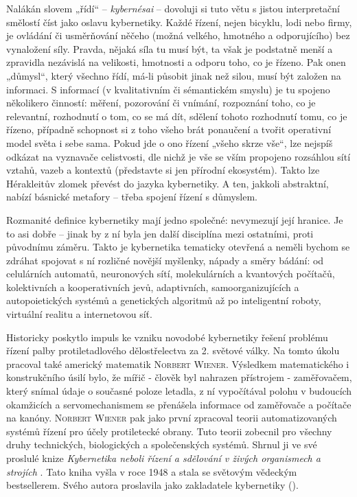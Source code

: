     Nalákán slovem „řídí“ – \emph{kybernésai} – dovoluji si tuto větu s jistou interpretační
    smělostí číst jako oslavu kybernetiky. Každé řízení, nejen bicyklu, lodi nebo firmy, je ovládání
    či usměrňování něčeho (možná velkého, hmotného a odporujícího) bez vynaložení síly. Pravda,
    nějaká síla tu musí být, ta však je podstatně menší a zpravidla nezávislá na velikosti,
    hmotnosti a odporu toho, co je řízeno. Pak onen „důmysl“, který všechno řídí, má-li působit
    jinak než silou, musí být založen na informaci. S informací (v kvalitativním či sémantickém
    smyslu) je tu spojeno několikero činností: měření, pozorování či vnímání, rozpoznání toho, co je
    relevantní, rozhodnutí o tom, co se má dít, sdělení tohoto rozhodnutí tomu, co je řízeno,
    případně schopnost si z toho všeho brát ponaučení a tvořit operativní model světa i sebe sama.
    Pokud jde o ono řízení „všeho skrze vše“, lze nejspíš odkázat na vyznavače celistvosti, dle
    nichž je vše se vším propojeno rozsáhlou sítí vztahů, vazeb a kontextů (představte si jen
    přírodní ekosystém). Takto lze Hérakleitův zlomek převést do jazyka kybernetiky. A ten, jakkoli
    abstraktní, nabízí básnické metafory – třeba spojení řízení s důmyslem.


    Rozmanité definice kybernetiky mají jedno společné: nevymezují její hranice. Je to asi dobře –
    jinak by z ní byla jen další disciplína mezi ostatními, proti původnímu záměru. Takto je
    kybernetika tematicky otevřená a neměli bychom se zdráhat spojovat s ní rozličné novější
    myšlenky, nápady a směry bádání: od celulárních automatů, neuronových sítí, molekulárních a
    kvantových počítačů, kolektivních a kooperativních jevů, adaptivních, samoorganizujících a
    autopoietických systémů a genetických algoritmů až po inteligentní roboty, virtuální realitu a
    internetovou síť.
 
    Historicky poskytlo impuls ke vzniku novodobé kybernetiky řešení problému řízení palby
    protiletadlového dělostřelectva za 2. světové války. Na tomto úkolu pracoval také americký
    matematik \textsc{Norbert Wiener}. Výsledkem matematického i konstrukčního úsilí bylo, že mířič
    - člověk byl nahrazen přístrojem - zaměřovačem, který snímal údaje o současné poloze letadla, z
    ní vypočítával polohu v budoucích okamžicích a servomechanismem se přenášela informace od
    zaměřovače a počítače na kanóny. \textsc{Norbert Wiener} pak jako první zpracoval teorii
    automatizovaných systémů řízení pro účely protiletecké obrany. Tuto teorii zobecnil pro všechny
    druhy technických, biologických a společenských systémů. Shrnul ji ve své proslulé knize
    \emph{Kybernetika neboli řízení a sdělování v živých organismech a strojích} \cite{Wiener1961}.
    Tato kniha vyšla v roce \num{1948} a stala se světovým vědeckým bestsellerem. Svého autora
    proslavila jako zakladatele kybernetiky (\cite[s.~6]{Svarc1986}).

